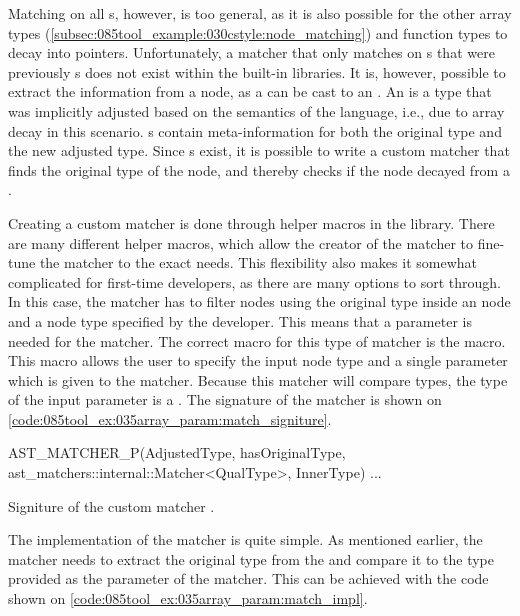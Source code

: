 Matching on all s, however, is too general, as it is also possible for the other array types (\cref{subsec:085tool_example:030cstyle:node_matching}) and function types to decay into pointers.
Unfortunately, a matcher that only matches on s that were previously s does not exist within the built-in libraries. It is, however, possible to extract the information from a node, as a  can be cast to an . An  is a type that was implicitly adjusted based on the semantics of the language, i.e., due to array decay in this scenario. s contain meta-information for both the original type and the new adjusted type. Since s exist, it is possible to write a custom matcher that finds the original type of the node, and thereby checks if the node decayed from a .

Creating a custom matcher is done through helper macros in the library. There are many different helper macros, which allow the creator of the matcher to fine-tune the matcher to the exact needs. This flexibility also makes it somewhat complicated for first-time developers, as there are many options to sort through. In this case, the matcher has to filter nodes using the original type inside an  node and a node type specified by the developer. This means that a parameter is needed for the matcher. The correct macro for this type of matcher is the  macro. This macro allows the user to specify the input node type and a single parameter which is given to the matcher. Because this matcher will compare types, the type of the input parameter is a . The signature of the matcher is shown on \cref{code:085tool_ex:035array_param:match_signiture}.

\begin{listing}[H]
    \begin{cppcode}
AST_MATCHER_P(AdjustedType, hasOriginalType, ast_matchers::internal::Matcher<QualType>, InnerType) {
    ...
}
    \end{cppcode}
    \caption{Signiture of the custom matcher .}
    \label{code:085tool_ex:035array_param:match_signiture}
\end{listing}

The implementation of the matcher is quite simple. As mentioned earlier, the matcher needs to extract the original type from the  and compare it to the type provided as the parameter of the matcher. This can be achieved with the code shown on \cref{code:085tool_ex:035array_param:match_impl}.

